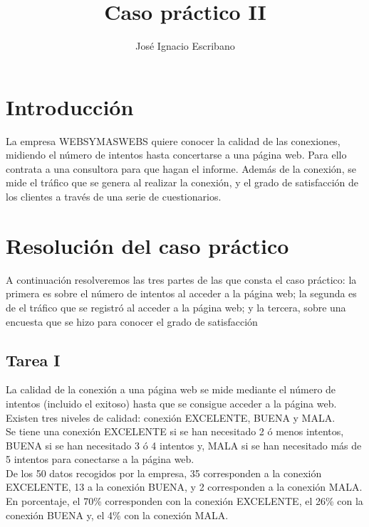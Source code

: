 \documentclass[12pt,a4paper,twoside,openright,titlepage,final]{article}
\author{José Ignacio Escribano}
\title{Caso práctico II}
\begin{document}
\setcounter{page}{1}


\listoffigures
\thispagestyle{empty}
\newpage

\tableofcontents
\thispagestyle{empty}
\newpage


\setcounter{page}{1}

\section{Introducción}

La empresa WEBSYMASWEBS quiere conocer la calidad de las conexiones, midiendo el número de intentos hasta concertarse a una página web. Para ello contrata a una consultora para que hagan el informe. Además de la conexión, se mide el tráfico que se genera al realizar la conexión, y el grado de satisfacción de los clientes a través de una serie de cuestionarios.

\section{Resolución del caso práctico}

A continuación resolveremos las tres partes de las que consta el caso práctico: la primera es sobre el número de intentos al acceder a la página web; la segunda es de el tráfico que se registró al acceder a la página web; y la tercera, sobre una encuesta que se hizo para conocer el grado de satisfacción 

\subsection{Tarea I}

La calidad de la conexión a una página web se mide mediante el número de intentos (incluido el exitoso) hasta que se consigue acceder a la página web. Existen tres niveles de calidad: conexión EXCELENTE, BUENA y MALA.\\
Se tiene una conexión EXCELENTE si se han necesitado 2 ó menos intentos, BUENA si se han necesitado 3 ó 4 intentos y, MALA si se han necesitado más de 5 intentos para conectarse a la página web.\\

De los 50 datos recogidos por la empresa, 35 corresponden a la conexión EXCELENTE, 13 a la conexión BUENA, y 2 corresponden a la conexión MALA. En porcentaje, el 70\% corresponden con la conexión EXCELENTE, el 26\% con la conexión BUENA y, el 4\% con la conexión MALA.\\
\end{document}
